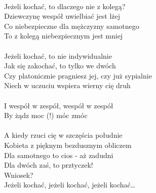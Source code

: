 \documentclass[a5paper, 10pt]{book}
\begin{document}
\begin{minipage}[t]{0.8\textwidth}
  \\
  Jeżeli kochać, to dlaczego nie z kolegą?\\
  Dziewczynę wespół uwielbiać jest lżej\\
  Co niebezpieczne dla mężczyzny samotnego\\
  To z kolegą niebezpiecznym jest mniej\\
  \\
  Jeżeli kochać, to nie indywidualnie\\
  Jak się zakochać, to tylko we dwóch\\
  Czy platonicznie pragniesz jej, czy już sypialnie\\
  Niech w uczuciu wspiera wierny cię druh\\
  \\
  \hspace*{8mm}I wespół w zespół, wespół w zespół\\
  \hspace*{8mm}By żądz moc (!) móc zmóc\\
  \\
  A kiedy rzuci cię w szczęścia południe\\
  Kobieta z pięknym bezdusznym obliczem\\
  Dla samotnego to cios - aż zadudni\\
  Dla dwóch zaś, to prztyczek!\\

  \hspace*{4mm}Wniosek?\\
  \hspace*{4mm}Jeżeli kochać, jeżeli kochać, jeżeli kochać… \\
\end{minipage}
\end{document}
